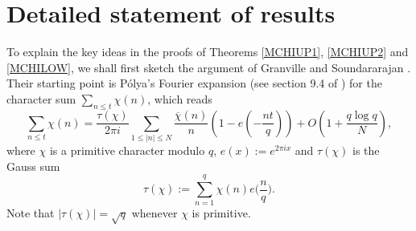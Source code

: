 \documentclass[12pt]{amsart}
\theoremstyle{definition}
\numberwithin{equation}{section}
\begin{document}
\section{Detailed statement of results} 
To explain the key ideas in the proofs of Theorems \ref{MCHIUP1}, \ref{MCHIUP2} and \ref{MCHILOW}, we shall first sketch the argument of Granville and Soundararajan \cite{GrSo2}. Their starting point is P\'olya's Fourier expansion (see section 9.4 of \cite{MVbook}) for the character sum
$\sum_{n\leq t}\chi(n)$, which reads 
\begin{equation}\label{Polya}
\sum_{n\leq t}\chi(n)
=\frac{\tau(\chi)}{2\pi i}
	\sum_{1\leq |n|\leq N} \frac{\overline{\chi}(n)}{n}
		\left(1-e\left(-\frac{nt}{q}\right)\right)
		+O\left(1+\frac{q\log q}{N}\right),
\end{equation}
where $\chi$ is a primitive character modulo $q$,  $e(x) := e^{2\pi i x}$ and $\tau(\chi)$ is the Gauss sum 
$$
 \tau(\chi) := \sum_{n=1}^q \chi(n) e\Big(\frac{n}{q}\Big).
$$
Note that $|\tau(\chi)| = \sqrt{q}$ whenever $\chi$ is primitive.
\end{document}
